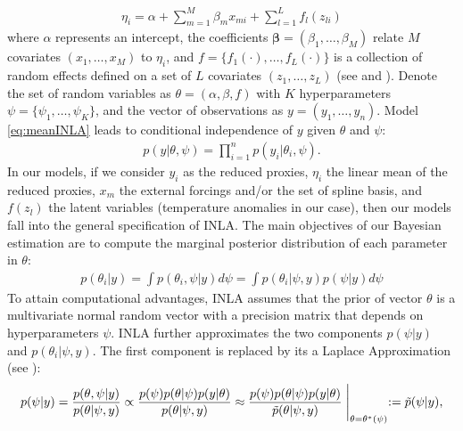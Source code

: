 \documentclass[12pt]{amsart}
\theoremstyle{plain}
\theoremstyle{definition}
\theoremstyle{remark}
\newcommand{\bl}[1]{\color{ForestGreen}\textbf{[Bo: #1]}\normalcolor}
\begin{document}


\begin{align}\label{eq:meanINLA}
  \eta_i = \alpha +\sum_{m=1}^M\beta_mx_{mi}+\sum_{l=1}^Lf_l(z_{li})
\end{align}
where $\alpha$ represents an intercept, the coefficients
$\mathbf{\beta} = (\beta_1,\ldots,\beta_M)$ relate $M$ covariates
$(x_1,\ldots,x_M)$ to $\eta_i$, and $f = \{f_1(\cdot),\ldots,f_L(\cdot)\}$ is a collection of
random effects defined on a set of $L$ covariates $(z_1,\ldots,z_L)$ (see
\cite{Rue2009} and \cite{Blangiardo2013}). 
Denote the set of random variables as
$\theta = (\alpha,\beta,f)$ with $K$ hyperparameters $\psi =
\{\psi_1,\ldots,\psi_K\}$, and the vector of observations as $y=(y_1,\ldots,y_n)$. Model \eqref{eq:meanINLA} leads to conditional independence of $y$ given $\theta$ and $\psi$:
\begin{align*}
  p(y|\theta,\psi)=\prod_{i=1}^np(y_i|\theta_i,\psi).
\end{align*}
In our models, if we consider $y_i$ as the reduced proxies,  $\eta_i$ the
linear mean of the reduced proxies, $x_m$ the external forcings and/or the set
of spline basis, and $f(z_l)$ the latent variables (temperature anomalies in
our case), then our models fall into the general specification of INLA. %
The main objectives of our Bayesian estimation are to compute the
marginal posterior distribution of each parameter in $\theta$:
\begin{align*}
  p(\theta_i|y) = \int p(\theta_i,\psi|y)d \psi = \int p(\theta_i|\psi,y)p(\psi|y)d \psi
\end{align*}
To attain computational advantages, INLA assumes that the prior of
vector $\theta$ is a multivariate normal random vector with a precision matrix
that depends on hyperparameters $\psi$. INLA further 
approximates the two components $p(\psi|y)$ and $p(\theta_i|\psi,y)$. The first component is replaced by its a
Laplace Approximation (see \cite{Tierney1986}):
\begin{align*}
  p(\psi|y)=\frac{p(\theta,\psi|y)}{p(\theta|\psi,y)}\propto \frac{p(\psi)p(\theta|\psi)p(y|\theta)}{p(\theta|\psi,y)}
            \approx  \frac{p(\psi)p(\theta|\psi)p(y|\theta)}{\tilde p(\theta|\psi,y)} \Biggm |_{\theta=\theta^*(\psi)} := \tilde p(\psi|y),
\end{align*}
\end{document}
